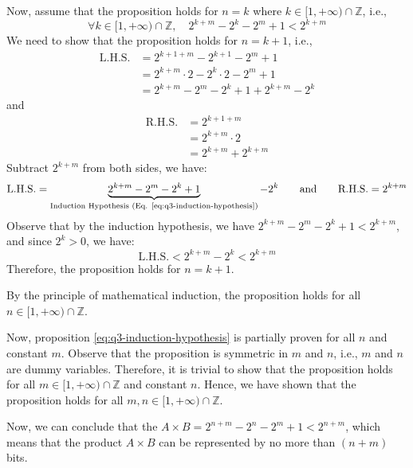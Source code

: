 \documentclass[answers]{exam}
\begin{document}
\begin{questions}
\begin{solution}
        Now, assume that the proposition holds for $n=k$ where $k\in[1,+\infty)\cap\mathbb{Z}$, i.e.,
        \begin{equation} \label{eq:q3-induction-hypothesis}
            \forall k\in[1,+\infty)\cap\mathbb{Z}, \quad 2^{k+m} - 2^{k} - 2^{m} + 1 < 2^{k+m}
        \end{equation}
        We need to show that the proposition holds for $n=k+1$, i.e.,
        \begin{align*}
            \text{L.H.S.} &= 2^{k+1+m} - 2^{k+1} - 2^{m} + 1 \\
            &= 2^{k+m} \cdot 2 - 2^{k} \cdot 2 - 2^{m} + 1 \\
            &= 2^{k+m} - 2^{m} - 2^{k} + 1 + 2^{k+m} - 2^{k}
        \end{align*}
        and
        \begin{align*}
            \text{R.H.S.} &= 2^{k+1+m} \\
            &= 2^{k+m} \cdot 2 \\
            &= 2^{k+m} + 2^{k+m}
        \end{align*}
        Subtract $2^{k+m}$ from both sides, we have:
        \[
            \text{L.H.S.} = \underbrace{2^{k+m} - 2^{m} - 2^{k} + 1}_{\text{Induction Hypothesis (Eq. \ref{eq:q3-induction-hypothesis})}} - 2^{k} \qquad \text{and} \qquad
            \text{R.H.S.} = 2^{k+m}
        \]
        Observe that by the induction hypothesis, we have $2^{k+m} - 2^{m} - 2^{k} + 1 < 2^{k+m}$,
        and since $2^{k} > 0$, we have:
        \[
            \text{L.H.S.} < 2^{k+m} - 2^{k} < 2^{k+m}
        \]
        Therefore, the proposition holds for $n=k+1$.

        By the principle of mathematical induction, the proposition holds for all $n\in[1,+\infty)\cap\mathbb{Z}$.

        Now, proposition \ref{eq:q3-induction-hypothesis} is partially proven for all $n$ and constant $m$.
        Observe that the proposition is symmetric in $m$ and $n$, i.e., $m$ and $n$ are dummy variables.
        Therefore, it is trivial to show that the proposition holds for all $m\in[1,+\infty)\cap\mathbb{Z}$ and constant $n$.
        Hence, we have shown that the proposition holds for all $m,n\in[1,+\infty)\cap\mathbb{Z}$.

        Now, we can conclude that the $A\times B = 2^{n+m} - 2^{n} - 2^{m} + 1 < 2^{n+m}$, which means
        that the product $A\times B$ can be represented by no more than $(n+m)$ bits.
        

\end{solution}
\end{questions}
\end{document}
